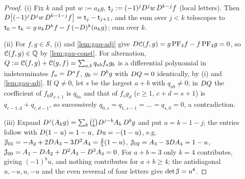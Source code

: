 \begin{proof}
(i) Fix $k$ and put $w:=a_kg$, $\mathsf t_j:=(-1)^jD^jw\,D^{k-j}f$ (local letters). Then $D\bigl[(-1)^jD^jw\,D^{k-1-j}f\bigr]=\mathsf t_j-\mathsf t_{j+1}$, and the sum over $j<k$ telescopes to $\mathsf t_0-\mathsf t_k=g\,a_kD^kf-f\,(-D)^k(a_kg)$; sum over $k$.

(ii) For $f,g\in\mathcal S$, (i) and \cref{lem:gau-adj} give $D\mathcal{C}(f,g)=g\,\mathrm{PF}_{4} f-f\,\mathrm{PF}_{4} g=0$, so $\mathcal{C}(f,g)\in\mathbb{Q}$ by \cref{lem:gau-const}. For alternation, $Q:=\mathcal{C}(f,g)+\mathcal{C}(g,f)=\sum_{a,b}q_{ab}f_ag_b$ is a differential polynomial in indeterminates $f_a=D^af$, $g_b=D^bg$ with $D Q=0$ identically, by (i) and \cref{lem:gau-adj}. If $Q\neq0$, let $s$ be the largest $a+b$ with $q_{ab}\neq0$; in $D Q$ the coefficient of $f_0g_{s+1}$ is $q_{0s}$ and that of $f_cg_d$ ($c\geq1$, $c+d=s+1$) is $q_{c-1,d}+q_{c,d-1}$, so successively $q_{0,s}=q_{1,s-1}=\dots=q_{s,0}=0$, a contradiction.

(iii) Expand $D^j(A_kg)=\sum_b\binom jbD^{j-b}A_k\,D^bg$ and put $a=k-1-j$; the entries follow with $D(1-u)=1-u$, $D u=-(1-u)$, e.g.\ $\mathcal{J}_{01}=-A_2+2D A_3-3D^2A_4=\frac25(1-u)$, $\mathcal{J}_{02}=A_3-3D A_4=1-u$, $\mathcal{J}_{00}=A_1-D A_2+D^2A_3-D^3A_4=0$. For $a+b=3$ only $k=4$ contributes, giving $(-1)^bu$, and nothing contributes for $a+b\geq4$; the antidiagonal $u,-u,u,-u$ and the even reversal of four letters give $\det\mathcal{J}=u^4$.


\end{proof}

